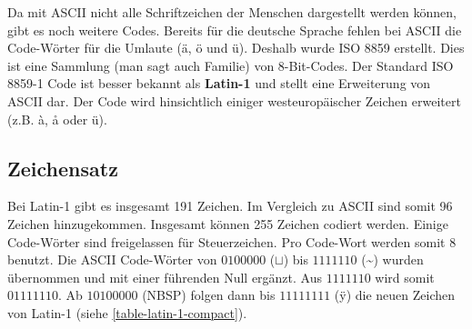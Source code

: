 Da mit \ac{ASCII} nicht alle Schriftzeichen der Menschen dargestellt werden können, gibt es noch weitere Codes. Bereits für die deutsche Sprache fehlen bei \ac{ASCII} die Code-Wörter für die Umlaute (ä, ö und ü). Deshalb wurde ISO 8859 erstellt. Dies ist eine Sammlung (man sagt auch Familie) von $8$-Bit-Codes. Der Standard ISO 8859-1 Code ist besser bekannt als \textbf{Latin-1} und stellt eine Erweiterung von \ac{ASCII} dar. Der Code wird hinsichtlich einiger westeuropäischer Zeichen erweitert (z.B. à, å oder ü). 

\subsection{Zeichensatz}

Bei Latin-1 gibt es insgesamt \num{191} Zeichen. Im Vergleich zu \ac{ASCII} sind somit \num{96} Zeichen hinzugekommen. Insgesamt können \num{255} Zeichen codiert werden. Einige Code-Wörter sind freigelassen für Steuerzeichen. Pro Code-Wort werden somit \qty{8}{\bit} benutzt. Die \ac{ASCII} Code-Wörter von $0100000$ ($\sqcup$) bis $1111110$ (\textasciitilde) wurden übernommen und mit einer führenden Null ergänzt. Aus $1111110$ wird somit $01111110$. Ab $10100000$ (\ac{NBSP}) folgen dann bis $11111111$ (ÿ) die neuen Zeichen von Latin-1 (siehe \autoref{table-latin-1-compact}).


